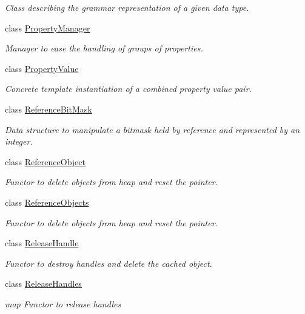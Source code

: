 \begin{DoxyCompactItemize}
\begin{DoxyCompactList}\small\item\em Class describing the grammar representation of a given data type. \end{DoxyCompactList}\item 
class \hyperlink{class_d_d4hep_1_1_property_manager}{Property\+Manager}
\begin{DoxyCompactList}\small\item\em Manager to ease the handling of groups of properties. \end{DoxyCompactList}\item 
class \hyperlink{class_d_d4hep_1_1_property_value}{Property\+Value}
\begin{DoxyCompactList}\small\item\em Concrete template instantiation of a combined property value pair. \end{DoxyCompactList}\item 
class \hyperlink{class_d_d4hep_1_1_reference_bit_mask}{Reference\+Bit\+Mask}
\begin{DoxyCompactList}\small\item\em Data structure to manipulate a bitmask held by reference and represented by an integer. \end{DoxyCompactList}\item 
class \hyperlink{class_d_d4hep_1_1_reference_object}{Reference\+Object}
\begin{DoxyCompactList}\small\item\em Functor to delete objects from heap and reset the pointer. \end{DoxyCompactList}\item 
class \hyperlink{class_d_d4hep_1_1_reference_objects}{Reference\+Objects}
\begin{DoxyCompactList}\small\item\em Functor to delete objects from heap and reset the pointer. \end{DoxyCompactList}\item 
class \hyperlink{class_d_d4hep_1_1_release_handle}{Release\+Handle}
\begin{DoxyCompactList}\small\item\em Functor to destroy handles and delete the cached object. \end{DoxyCompactList}\item 
class \hyperlink{class_d_d4hep_1_1_release_handles}{Release\+Handles}
\begin{DoxyCompactList}\small\item\em map Functor to release handles \end{DoxyCompactList}\item 

\end{DoxyCompactItemize}
